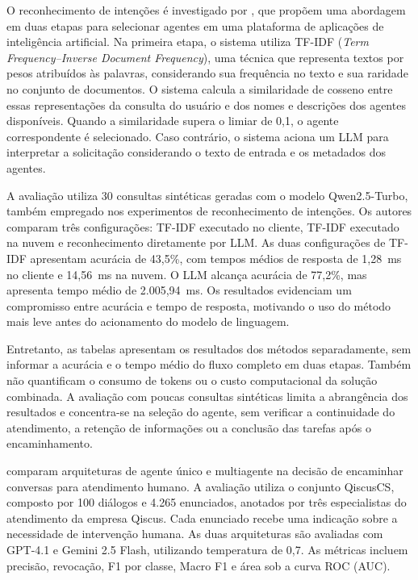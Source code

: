 O reconhecimento de intenções é investigado por \textcite{yang2025}, que propõem uma abordagem em duas etapas para selecionar agentes em uma plataforma de aplicações de inteligência artificial. Na primeira etapa, o sistema utiliza TF-IDF (\textit{Term Frequency--Inverse Document Frequency}), uma técnica que representa textos por pesos atribuídos às palavras, considerando sua frequência no texto e sua raridade no conjunto de documentos. O sistema calcula a similaridade de cosseno entre essas representações da consulta do usuário e dos nomes e descrições dos agentes disponíveis. Quando a similaridade supera o limiar de 0,1, o agente correspondente é selecionado. Caso contrário, o sistema aciona um LLM para interpretar a solicitação considerando o texto de entrada e os metadados dos agentes.

A avaliação utiliza 30 consultas sintéticas geradas com o modelo Qwen2.5-Turbo, também empregado nos experimentos de reconhecimento de intenções. Os autores comparam três configurações: TF-IDF executado no cliente, TF-IDF executado na nuvem e reconhecimento diretamente por LLM. As duas configurações de TF-IDF apresentam acurácia de 43,5\%, com tempos médios de resposta de 1,28~ms no cliente e 14,56~ms na nuvem. O LLM alcança acurácia de 77,2\%, mas apresenta tempo médio de 2.005,94~ms. Os resultados evidenciam um compromisso entre acurácia e tempo de resposta, motivando o uso do método mais leve antes do acionamento do modelo de linguagem.

Entretanto, as tabelas apresentam os resultados dos métodos separadamente, sem informar a acurácia e o tempo médio do fluxo completo em duas etapas. Também não quantificam o consumo de tokens ou o custo computacional da solução combinada. A avaliação com poucas consultas sintéticas limita a abrangência dos resultados e concentra-se na seleção do agente, sem verificar a continuidade do atendimento, a retenção de informações ou a conclusão das tarefas após o encaminhamento.

\textcite{amri2026} comparam arquiteturas de agente único e multiagente na decisão de encaminhar conversas para atendimento humano. A avaliação utiliza o conjunto QiscusCS, composto por 100 diálogos e 4.265 enunciados, anotados por três especialistas do atendimento da empresa Qiscus. Cada enunciado recebe uma indicação sobre a necessidade de intervenção humana. As duas arquiteturas são avaliadas com GPT-4.1 e Gemini 2.5 Flash, utilizando temperatura de 0,7. As métricas incluem precisão, revocação, F1 por classe, Macro F1 e área sob a curva ROC (AUC).

